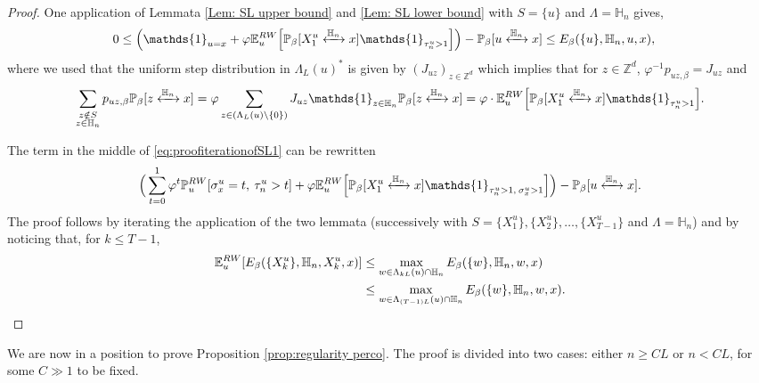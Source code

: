 \documentclass[11pt,a4paper]{article}
\numberwithin{equation}{section}
\theoremstyle{plain}
\theoremstyle{definition}
\newcommand{\connect}{\xleftrightarrow}
\begin{document}
\begin{proof} One application of Lemmata \ref{Lem: SL upper bound} and \ref{Lem: SL lower bound} with $S=\{u\}$ and $\Lambda=\mathbb H_n$ gives,
\begin{align}\label{eq:proofiterationofSL1}
	0\leq \Big(\mathds{1}_{u=x}+\varphi \mathbb E_u^{\rm RW}\Big[\mathbb P_\beta[X_1^u\connect{\mathbb H_n\:}x]\mathds{1}_{\tau_n^u>1}\Big]\Big)&-\mathbb P_\beta[u\connect{\mathbb H_n\:}x]\leq E_\beta(\{u\},\mathbb H_n,u,x),
\end{align}
where we used that the uniform step distribution in $\Lambda_L(u)^*$ is given by $(J_{uz})_{z\in \mathbb Z^d}$ which implies that for $z\in \mathbb Z^d$, $ \varphi^{-1} p_{uz,\beta}=J_{uz}$ and
\begin{equation}
	\sum_{\substack{z\notin S\\z\in \mathbb H_n}}p_{uz,\beta}\mathbb P_\beta[z\connect{\mathbb H_n\:}x]=\varphi \sum_{z\in (\Lambda_L(u)\setminus \{0\})} J_{uz}\mathds{1}_{z\in \mathbb H_n}\mathbb P_\beta[z\connect{\mathbb H_n\:}x]= \varphi \cdot \mathbb E^{\rm RW}_u\Big[\mathbb P_\beta[X_1^u\connect{\mathbb H_n\:}x]\mathds{1}_{\tau^u_n>1}\Big].
\end{equation}

The term in the middle of \eqref{eq:proofiterationofSL1} can be rewritten
\begin{equation}
\Big(\sum_{t=0}^1\varphi^t\mathbb P^{\rm RW}_{u}[\sigma^u_x=t, \: \tau_n^u>t]+\varphi \mathbb E_u^{\rm RW}\Big[\mathbb P_\beta[X_1^u\connect{\mathbb H_n\:}x]\mathds{1}_{\tau_n^u>1,\:\sigma^u_x>1}\Big]\Big)-\mathbb P_\beta[u\connect{\mathbb H_n\:}x].
\end{equation}
The proof follows by iterating the application of the two lemmata (successively with $S=\{X_1^u\},\{X_2^u\},\ldots,\{X_{T-1}^u\}$ and $\Lambda=\mathbb H_n$) and by noticing that,  for $k\leq T-1$,
\begin{align}\notag
	\mathbb E_u^{\rm RW}[E_\beta(\{X_k^u\},\mathbb H_n,X_k^u,x)]&\leq \max_{w\in \Lambda_{kL}(u)\cap \mathbb H_n}E_\beta(\{w\},\mathbb H_n,w,x)\\&\leq \max_{w\in \Lambda_{(T-1)L}(u)\cap \mathbb H_n}E_\beta(\{w\},\mathbb H_n,w,x).
\end{align}
\end{proof}
We are now in a position to prove Proposition \ref{prop:regularity perco}. The proof is divided into two cases: either $n\geq CL$ or $n<CL$, for some $C\gg 1$ to be fixed.
\end{document}
